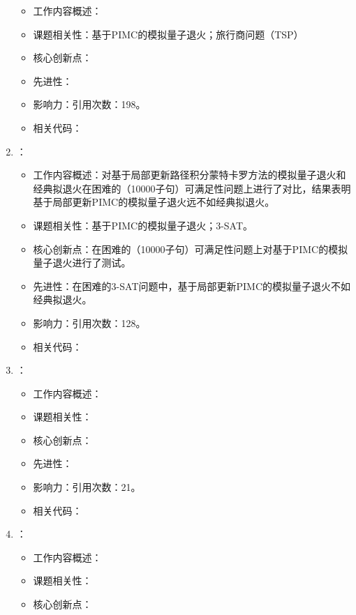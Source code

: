 \begin{enumerate}
\begin{itemize}
                \item 工作内容概述：
                \item 课题相关性：基于PIMC的模拟量子退火；旅行商问题（TSP）
                \item 核心创新点：
                \item 先进性：
                \item 影响力：引用次数：198。
                \item 相关代码：
            \end{itemize}
            \item \citet{battaglia2005optimization}：
            \begin{itemize}
                \item 工作内容概述：对基于局部更新路径积分蒙特卡罗方法的模拟量子退火和经典拟退火在困难的（10000子句）可满足性问题上进行了对比，结果表明基于局部更新PIMC的模拟量子退火远不如经典拟退火。
                \item 课题相关性：基于PIMC的模拟量子退火；3-SAT。
                \item 核心创新点：在困难的（10000子句）可满足性问题上对基于PIMC的模拟量子退火进行了测试。
                \item 先进性：在困难的3-SAT问题中，基于局部更新PIMC的模拟量子退火不如经典拟退火。
                \item 影响力：引用次数：128。
                \item 相关代码：
            \end{itemize}
            \item \citet{gregor2005minimization}：
            \begin{itemize}
                \item 工作内容概述：
                \item 课题相关性：
                \item 核心创新点：
                \item 先进性：
                \item 影响力：引用次数：21。
                \item 相关代码：
            \end{itemize}
            \item \citet{sarjala2006optimization}：
            \begin{itemize}
                \item 工作内容概述：
                \item 课题相关性：
                \item 核心创新点：

\end{itemize}
\end{enumerate}
